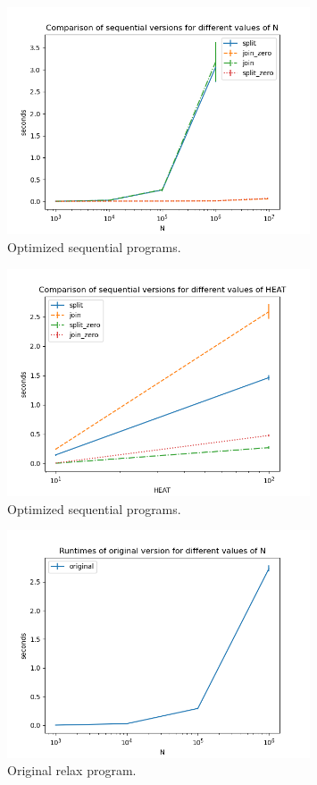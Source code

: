 \documentclass[a4paper]{article}
\begin{document}
\begin{figure}[H]
    \centering
    \includegraphics[width = 0.8\textwidth]{graphs/n/Comparison of sequential versions for different values of N.png}
    \caption{Optimized sequential programs.}
    \label{fig: seq n}
\end{figure}

\begin{figure}[H]
    \centering
    \includegraphics[width = 0.8\textwidth]{graphs/heat/Comparison of sequential versions for different values of HEAT.png}
    \caption{Optimized sequential programs.}
    \label{fig: seq heat}
\end{figure}

\begin{figure}[H]
    \centering
    \includegraphics[width = 0.8\textwidth]{graphs/n/Runtimes of original version for different values of N.png}
    \caption{Original relax program.}
    \label{fig: orig n}
\end{figure}
\end{document}
